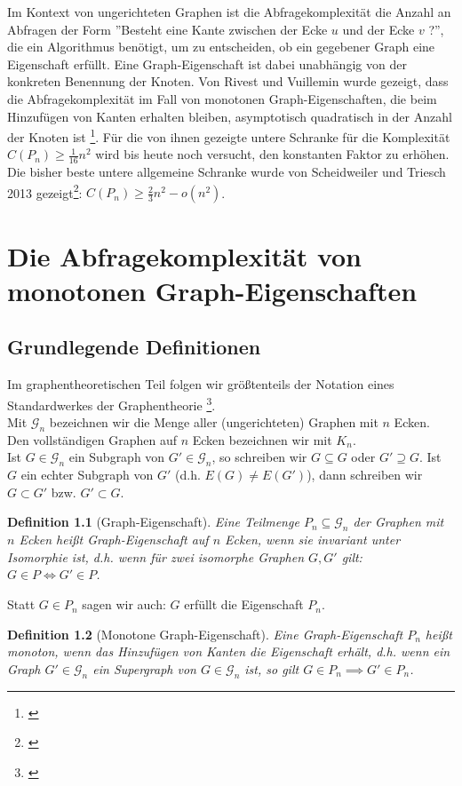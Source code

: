 \documentclass[a4paper]{scrreprt}
\newtheorem{definition}{Definition}
\theoremstyle{definition}
\begin{document}
Im Kontext von ungerichteten Graphen
ist die Abfragekomplexität die Anzahl
an Abfragen der Form ''Besteht eine Kante zwischen
der Ecke $u$ und der Ecke $v$ ?'', die ein Algorithmus
benötigt, um zu entscheiden, ob ein gegebener Graph
eine Eigenschaft erfüllt. Eine Graph-Eigenschaft ist
dabei unabhängig von der konkreten Benennung der Knoten.
Von Rivest und Vuillemin wurde gezeigt,
dass die Abfragekomplexität
im Fall von monotonen Graph-Eigenschaften, die beim 
Hinzufügen von Kanten erhalten bleiben, asymptotisch
quadratisch in der Anzahl der Knoten
ist \footnote{\cite{Rivest}}. Für die von
ihnen gezeigte untere Schranke für die Komplexität
$C(P_n) \geq \frac{1}{16}n^2$ wird bis heute noch
versucht, den konstanten Faktor zu erhöhen. Die bisher beste
untere allgemeine Schranke wurde von Scheidweiler
und Triesch 2013 gezeigt\footnote{\cite{Scheidweiler}}:
$C(P_n) \geq \frac{2}{3}n^2 - o(n^2)$.


\chapter{Die Abfragekomplexität von monotonen Graph-Eigenschaften}
\section{Grundlegende Definitionen}
Im graphentheoretischen Teil folgen wir größtenteils
der Notation eines Standardwerkes der Graphentheorie \footnote{\cite{diestel}}. \\
Mit $\mathcal{G}_n$ bezeichnen wir die Menge aller
(ungerichteten) Graphen mit $n$ Ecken. \\
Den vollständigen Graphen auf $n$ Ecken bezeichnen wir
mit $K_n$. \\
Ist $G \in \mathcal{G}_n$ ein Subgraph von $G' \in \mathcal{G}_n$,
so schreiben wir $G \subseteq G$ oder $G' \supseteq G$. Ist $G$ ein
echter Subgraph von $G'$ (d.h. $E(G) \neq E(G')$), dann schreiben
wir $G \subset G'$ bzw. $G' \subset G$.


\begin{definition}[Graph-Eigenschaft]
Eine Teilmenge $P_n \subseteq \mathcal{G}_n$ der Graphen mit
$n$ Ecken heißt \emph{Graph-Eigenschaft auf $n$ Ecken},
wenn sie invariant unter Isomorphie ist,
d.h. wenn für zwei isomorphe Graphen $G, G'$ gilt:
$G \in P \iff G' \in P$.
\end{definition}
Statt $G \in P_n$ sagen wir auch: $G$ erfüllt die Eigenschaft $P_n$.


\begin{definition}[Monotone Graph-Eigenschaft]
Eine Graph-Eigenschaft $P_n$ heißt \emph{monoton}, wenn das
Hinzufügen von Kanten die Eigenschaft erhält,
d.h. wenn ein Graph
$G' \in \mathcal{G}_n$ ein Supergraph von
$G \in \mathcal{G}_n$ ist, so gilt 
$G \in P_n \implies G' \in P_n$.
\end{definition}
\end{document}
